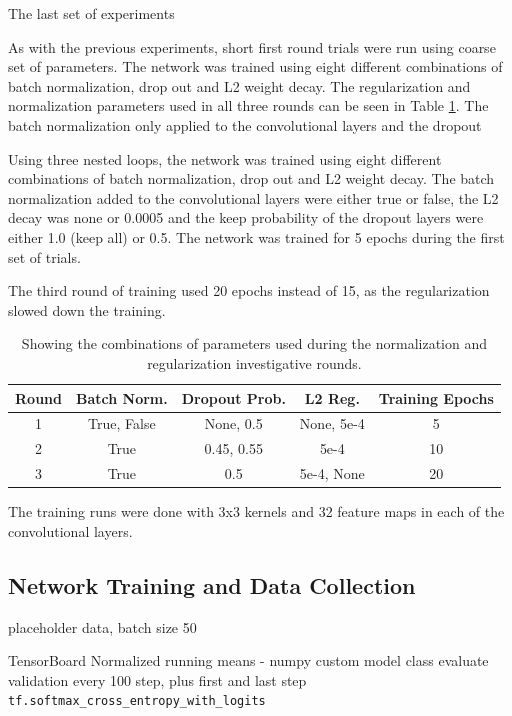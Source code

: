 \documentclass[]{article}
\begin{document}
The last set of experiments 

As with the previous experiments, short first round trials were run using coarse set of parameters. The network was trained using eight different combinations of batch normalization, drop out and L2 weight decay. The regularization and normalization parameters used in all three rounds can be seen in Table \ref{reg-table}. The batch normalization only applied to the convolutional layers and the dropout 

Using three nested loops, the network was trained using eight different combinations of batch normalization, drop out and L2 weight decay. The batch normalization added to the convolutional layers were either true or false, the L2 decay was none or 0.0005 and the keep probability of the dropout layers were either 1.0 (keep all) or 0.5. The network was trained for 5 epochs during the first set of trials. 

The third round of training used 20 epochs instead of 15, as the regularization slowed down the training.

\begin{table}[h]
	\centering
	\caption{Showing the combinations of parameters used during the normalization and regularization investigative rounds.}
	\label{reg-table}
	\begin{tabular}{@{}ccccc@{}}
		\toprule
		Round & Batch Norm. \tablefootnote{Batch Normalization} & Dropout Prob. \tablefootnote{Dropout keep probability} & L2 Reg. \tablefootnote{L2 Regularization Weight Decay} & Training Epochs \\ \midrule
		1 & True, False & None, 0.5 & None, 5e-4 & 5 \\
		2 & True & 0.45, 0.55 & 5e-4 & 10 \\
		3 & True & 0.5 & 5e-4, None & 20 \\ \bottomrule
	\end{tabular}
\end{table}

The training runs were done with 3x3 kernels and 32 feature maps in each of the convolutional layers. 

\subsection{Network Training and Data Collection}

placeholder data, batch size 50

TensorBoard 
Normalized running means - numpy
custom model class
evaluate validation every 100 step, plus first and last step
\texttt{tf.softmax\_cross\_entropy\_with\_logits}
\end{document}
